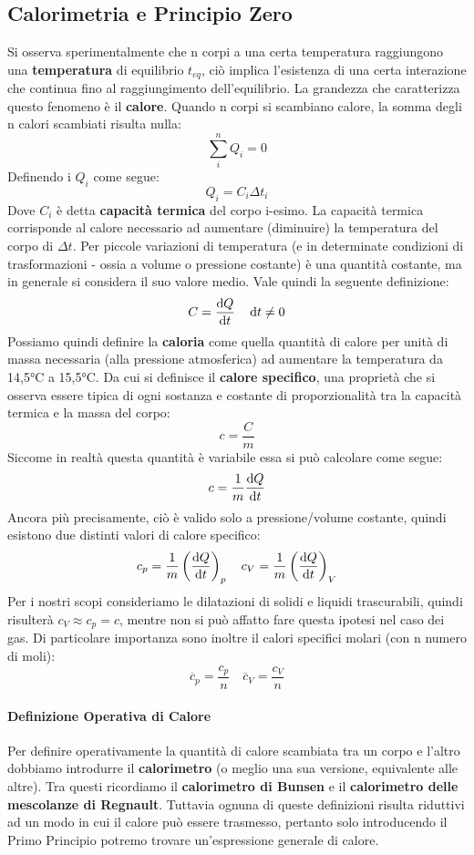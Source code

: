 \documentclass{article}
\begin{document}
\subsection{Calorimetria e Principio Zero}
Si osserva sperimentalmente che n corpi a una certa temperatura raggiungono una \textbf{temperatura} di equilibrio $t_{eq}$, ciò implica l'esistenza di una certa interazione che continua fino al raggiungimento dell'equilibrio. La grandezza che caratterizza questo fenomeno è il \textbf{calore}. Quando n corpi si scambiano calore, la somma degli n calori scambiati risulta nulla:
\[\sum_i^n Q_i=0\]
Definendo i $Q_i$ come segue:
\[Q_i=C_i\Delta t_i\]
Dove $C_i$ è detta \textbf{capacità termica} del corpo i-esimo. La capacità termica corrisponde al calore necessario ad aumentare (diminuire) la temperatura del corpo di $\Delta t$. Per piccole variazioni di temperatura (e in determinate condizioni di trasformazioni - ossia a volume o pressione costante) è una quantità costante, ma in generale si considera il suo valore medio. Vale quindi la seguente definizione:
\[C=\dv{Q}{t}\quad\dif t\neq 0\]
Possiamo quindi definire la \textbf{caloria} come quella quantità di calore per unità di massa necessaria (alla pressione atmosferica) ad aumentare la temperatura da 14,5\si{\degreeCelsius} a 15,5\si{\degreeCelsius}. Da cui si definisce il \textbf{calore specifico}, una proprietà che si osserva essere tipica di ogni sostanza e costante di proporzionalità tra la capacità termica e la massa del corpo:
\[c=\frac{C}{m}\]
Siccome in realtà questa quantità è variabile essa si può calcolare come segue:
\[c=\frac{1}{m}\dv{Q}{t}\]
Ancora più precisamente, ciò è valido solo a pressione/volume costante, quindi esistono due distinti valori di calore specifico:
\[c_p=\frac{1}{m}\left(\dv{Q}{t}\right)_p\quad c_V=\frac{1}{m}\left(\dv{Q}{t}\right)_V\]
Per i nostri scopi consideriamo le dilatazioni di solidi e liquidi trascurabili, quindi risulterà $c_V\approx c_p=c$, mentre non si può affatto fare questa ipotesi nel caso dei gas. Di particolare importanza sono inoltre il calori specifici molari (con n numero di moli):
\[\overline{c}_p=\frac{c_p}{n}\quad\overline{c}_V=\frac{c_V}{n}\]
\paragraph{Definizione Operativa di Calore}
Per definire operativamente la quantità di calore scambiata tra un corpo e l'altro dobbiamo introdurre il \textbf{calorimetro} (o meglio una sua versione, equivalente alle altre). Tra questi ricordiamo il \textbf{calorimetro di Bunsen} e il \textbf{calorimetro delle mescolanze di Regnault}. Tuttavia ognuna di queste definizioni risulta riduttivi ad un modo in cui il calore può essere trasmesso, pertanto solo introducendo il Primo Principio potremo trovare un'espressione generale di calore. 
\end{document}

